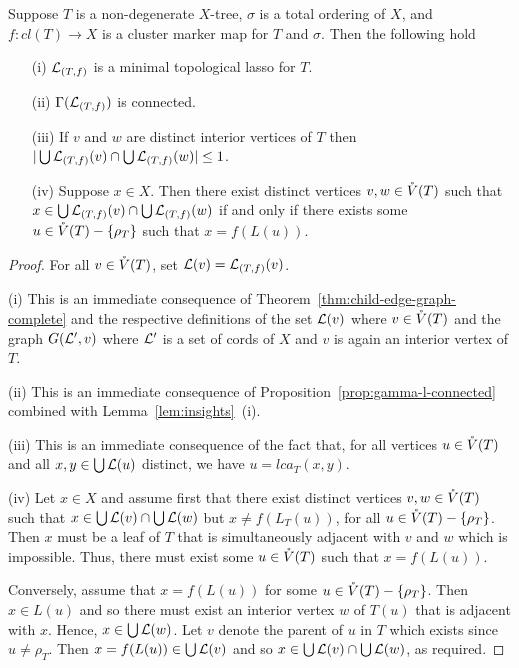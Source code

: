 \begin{lem}
  \label{lem:insights}
  Suppose $T$ is a non-degenerate $X$-tree, $\sigma$ is a total ordering of
  $X$, and $f:cl(T)\to X$ is a cluster marker map for $T$ and $\sigma$. Then
  the following hold
  \begin{enumerate}
  \item[(i)] ${\mathcal L}_{(T,f)}$ is a minimal topological lasso for $T$.
  \item[(ii)] $\Gamma({\mathcal L}_{(T,f)})$ is connected.
  \item[(iii)] If $v$ and $w$ are distinct interior vertices of $T$ then
    $|\bigcup {\mathcal L}_{(T,f)}(v)\cap \bigcup {\mathcal L}_{(T,f)}(w)|\leq 1$.
  \item[(iv)] Suppose $x\in X$. Then there exist distinct vertices $v,w\in
    \mathring{V}(T)$ such that $x\in \bigcup {\mathcal L}_{(T,f)}(v)\cap \bigcup {\mathcal L}_{(T,f)}(w)$
    if and only if there exists some $u\in \mathring{V}(T)-\{\rho_T\}$ such that
    $x=f(L(u))$.
  \end{enumerate}
\end{lem}
\begin{proof}
  For all $v\in \mathring{V}(T)$, set ${\mathcal L}(v)={\mathcal L}_{(T,f)}(v)$.

  (i) This is an immediate consequence of
  Theorem~\ref{thm:child-edge-graph-complete} and the respective definitions
  of the set ${\mathcal L}(v)$ where $v\in \mathring{V}(T)$ and the graph $G({\mathcal L}',v)$ where
  ${\mathcal L}'$ is a set of cords of $X$ and $v$ is again an interior vertex of $T$.
 

  (ii) This is an immediate consequence of
  Proposition~\ref{prop:gamma-l-connected} combined with
  Lemma~\ref{lem:insights}~(i).


  (iii) This is an immediate consequence of the fact that, for all vertices
  $u\in \mathring{V}(T)$ and all $x,y\in \bigcup{\mathcal L}(u)$ distinct, we have
  $u=lca_T(x,y)$.

  (iv) Let $x\in X$ and assume first that there exist distinct vertices
  $v,w\in \mathring{V}(T)$ such that $x\in \bigcup {\mathcal L}(v)\cap \bigcup {\mathcal L}(w)$ but
  $x\not =f(L_T(u))$, for all $u\in \mathring{V}(T)-\{\rho_T\}$. Then $x$ must be a
  leaf of $T$ that is simultaneously adjacent with $v$ and $w$ which is
  impossible. Thus, there must exist some $u\in \mathring{V}(T)$ such that $x=f(L(u))$.

  Conversely, assume that $x=f(L(u))$ for some $u\in \mathring{V}(T)-\{\rho_T\}$. Then
  $x\in L(u)$ and so there must exist an interior vertex $w$ of $T(u)$ that is
  adjacent with $x$.  Hence, $x\in\bigcup {\mathcal L}(w)$.  Let $v$ denote the parent
  of $u$ in $T$ which exists since $u\not=\rho_T$.  Then $x=f(L(u))\in \bigcup
  {\mathcal L}(v)$ and so $x\in \bigcup {\mathcal L}(v)\cap \bigcup {\mathcal L}(w)$, as required.
\end{proof}

